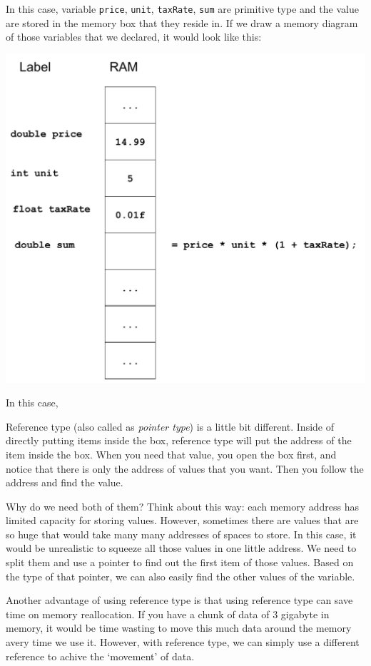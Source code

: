 \documentclass[../main.tex]{subfiles}
\begin{document}
In this case, variable \texttt{price}, \texttt{unit}, \texttt{taxRate}, \texttt{sum}
are primitive type and the value are stored in the memory box that they reside
in. If we draw a memory diagram of those variables that we declared, it would
look like this:

\includegraphics[scale = 0.5]{type/img/mmap-primitive.pdf}

In this case, 

Reference type (also called as \emph{pointer type}) is a little bit different.
Inside of directly putting items inside the box, reference type will put the
address of the item inside the box. When you need that value, you open the box
first, and notice that there is only the address of values that you want. Then
you follow the address and find the value.

Why do we need both of them? Think about this way: each memory address has
limited capacity for storing values. However, sometimes there are values that
are so huge that would take many many addresses of spaces to store. In this case,
it would be unrealistic to squeeze all those values in one little address. We
need to split them and use a pointer to find out the first item of those values.
Based on the type of that pointer, we can also easily find the other values
of the variable.

Another advantage of using reference type is that using reference type can save
time on memory reallocation. If you have a chunk of data of 3 gigabyte in memory,
it would be time wasting to move this much data around the memory avery time we
use it. However, with reference type, we can simply use a different reference to
achive the `movement' of data.
\end{document}
